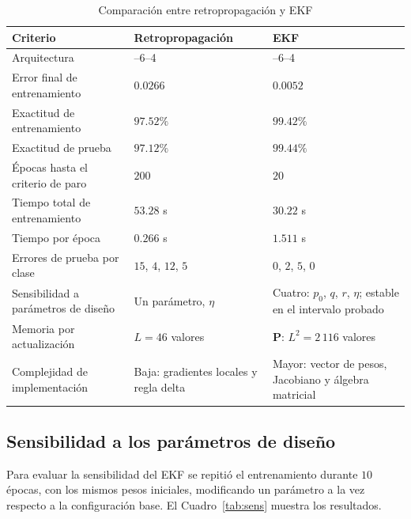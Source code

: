 \documentclass[conference]{IEEEtran}
\begin{document}
\begin{table}[htbp]
\caption{Comparación entre retropropagación y EKF}
\label{tab:comp}
\begin{center}
\setlength{\tabcolsep}{4pt}
\begin{tabular}{>{\raggedright\arraybackslash}p{}>{\raggedright\arraybackslash}p{}>{\raggedright\arraybackslash}p{}}
\toprule
\textbf{Criterio} & \textbf{Retropropagación} & \textbf{EKF} \\
\midrule
Arquitectura & 2--6--4 & 2--6--4 \\
Error final de entrenamiento & $0.0266$ & $0.0052$ \\
Exactitud de entrenamiento & $97.52\%$ & $99.42\%$ \\
Exactitud de prueba & $97.12\%$ & $99.44\%$ \\
Épocas hasta el criterio de paro & $200$ & $20$ \\
Tiempo total de entrenamiento & $53.28$ s & $30.22$ s \\
Tiempo por época & $0.266$ s & $1.511$ s \\
Errores de prueba por clase & $15$, $4$, $12$, $5$ & $0$, $2$, $5$, $0$ \\
Sensibilidad a parámetros de diseño & Un parámetro, $\eta$ & Cuatro: $p_0$, $q$, $r$, $\eta$; estable en el intervalo probado \\
Memoria por actualización & $L=46$ valores & $\mathbf{P}$: $L^2=2\,116$ valores \\
Complejidad de implementación & Baja: gradientes locales y regla delta & Mayor: vector de pesos, Jacobiano y álgebra matricial \\
\bottomrule
\end{tabular}
\end{center}
\end{table}

\subsection{Sensibilidad a los parámetros de diseño}
\label{sec:sens}
Para evaluar la sensibilidad del EKF se repitió el entrenamiento durante
$10$ épocas, con los mismos pesos iniciales, modificando un parámetro a la
vez respecto a la configuración base. El Cuadro~\ref{tab:sens} muestra los
resultados.
\end{document}
